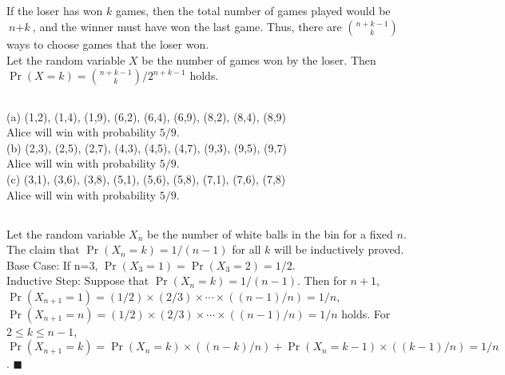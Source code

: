 \documentclass{article}
\begin{document}
\subsection{}
If the loser has won $\textit{k}$ games, then the total number of games played would be $\textit{n}+\textit{k}$, and the winner must have won the last game.
Thus, there are $\binom{n+k-1}{k}$ ways to choose games that the loser won.\\
Let the random variable $X$ be the number of games won by the loser. Then $\Pr(X=k)=\binom{n+k-1}{k}/2^{n+k-1}$ holds.
\subsection{}
(a) (1,2), (1,4), (1,9), (6,2), (6,4), (6,9), (8,2), (8,4), (8,9)\\
Alice will win with probability $5/9$.\\
(b) (2,3), (2,5), (2,7), (4,3), (4,5), (4,7), (9,3), (9,5), (9,7)\\
Alice will win with probability $5/9$.\\
(c) (3,1), (3,6), (3,8), (5,1), (5,6), (5,8), (7,1), (7,6), (7,8)\\
Alice will win with probability $5/9$.
\subsection{}
Let the random variable $X_n$ be the number of white balls in the bin for a fixed $n$. The claim that $\Pr(X_n=k)=1/(n-1)$ for all $k$ will be inductively proved.\\
Base Case: If n=3, $\Pr(X_3 = 1)=\Pr(X_3 = 2)=1/2$.\\
Inductive Step: Suppose that $\Pr(X_n = k) = 1/(n-1)$. Then for $n+1$, $\Pr(X_{n+1}=1)=(1/2)\times(2/3)\times\cdots\times((n-1)/n)=1/n$, $\Pr(X_{n+1}=n)=(1/2)\times(2/3)\times\cdots\times((n-1)/n)=1/n$ holds.
For $2\leq k \leq n-1$, $\Pr(X_{n+1}=k)=\Pr(X_n=k)\times((n-k)/n)+\Pr(X_n=k-1)\times((k-1)/n)=1/n$. $\blacksquare$
\end{document}
